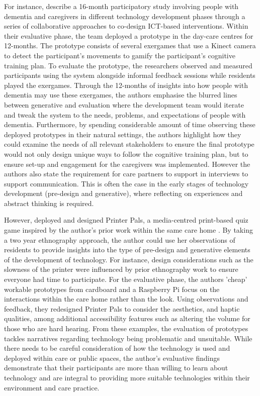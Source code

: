 For instance, \cite{unbehaun_facilitating_2018} describe a 16-month participatory study involving people with dementia and caregivers in different technology development phases through a series of collaborative approaches to co-design ICT-based interventions. Within their evaluative phase, the team deployed a prototype in the day-care centres for 12-months. The prototype consists of several exergames that use a Kinect camera to detect the participant's movements to gamify the participant's cognitive training plan. To evaluate the prototype, the researchers observed and measured participants using the system alongside informal feedback sessions while residents played the exergames. Through the 12-months of insights into how people with dementia may use these exergames, the authors emphasise the blurred lines between generative and evaluation where the development team would iterate and tweak the system to the needs, problems, and expectations of people with dementia. Furthermore, by spending considerable amount of time observing these deployed prototypes in their natural settings, the authors highlight how they could examine the needs of all relevant stakeholders to ensure the final prototype would not only design unique ways to follow the cognitive training plan, but to ensure set-up and engagement for the caregivers was implemented. However the authors also state the requirement for care partners to support in interviews to support communication. This is often the case in the early stages of technology development (pre-design and generative), where reflecting on experiences and abstract thinking is required.

However, \cite{foley_printer_2019} deployed and designed Printer Pals, a media-centred print-based quiz game inspired by the author's prior work within the same care home \citep{foley_struggle_2019}. By taking a two year ethnography approach, the author could use her observations of residents to provide insights into the type of pre-design and generative elements of the development of technology. For instance, design considerations such as the slowness of the printer were influenced by prior ethnography work to ensure everyone had time to participate. For the evaluative phase, the authors 'cheap' workable prototypes from cardboard and a Raspberry Pi focus on the interactions within the care home rather than the look. Using observations and feedback, they redesigned Printer Pals to consider the aesthetics, and haptic qualities, among additional accessibility features such as altering the volume for those who are hard hearing. From these examples, the evaluation of prototypes tackles narratives regarding technology being problematic and unsuitable. While there needs to be careful consideration of how the technology is used and deployed within care or public spaces, the author's evaluative findings demonstrate that their participants are more than willing to learn about technology and are integral to providing more suitable technologies within their environment and care practice.

